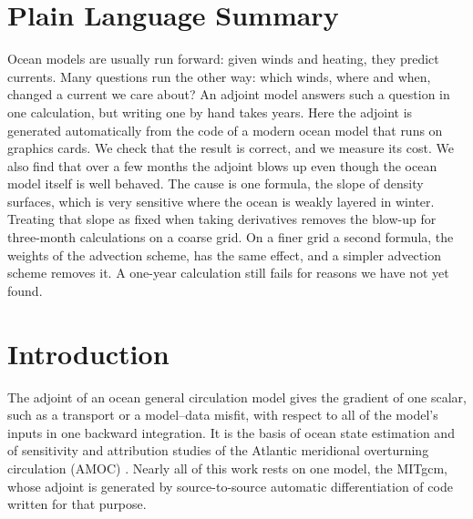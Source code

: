 \documentclass[11pt]{article}
\begin{document}
\section*{Plain Language Summary}
Ocean models are usually run forward: given winds and heating, they predict currents. Many questions run the other
way: which winds, where and when, changed a current we care about? An adjoint model answers such a question in one
calculation, but writing one by hand takes years. Here the adjoint is generated automatically from the code of a
modern ocean model that runs on graphics cards. We check that the result is correct, and we measure its cost. We
also find that over a few months the adjoint blows up even though the ocean model itself is well behaved. The cause
is one formula, the slope of density surfaces, which is very sensitive where the ocean is weakly layered in winter.
Treating that slope as fixed when taking derivatives removes the blow-up for three-month calculations on a coarse
grid. On a finer grid a second formula, the weights of the advection scheme, has the same effect, and a simpler
advection scheme removes it. A one-year calculation still fails for reasons we have not yet found.

\section{Introduction}

The adjoint of an ocean general circulation model gives the gradient of one scalar, such as a transport or a
model--data misfit, with respect to all of the model's inputs in one backward integration. It is the basis of
ocean state estimation \citep{forget2015} and of sensitivity and attribution studies of the Atlantic meridional
overturning circulation (AMOC) \citep{marotzke1999, pillar2016, smith2019, kostov2021}. Nearly all of this work
rests on one model, the MITgcm, whose adjoint is generated by source-to-source automatic differentiation
\citep{giering1998, heimbach2005} of code written for that purpose.
\end{document}
